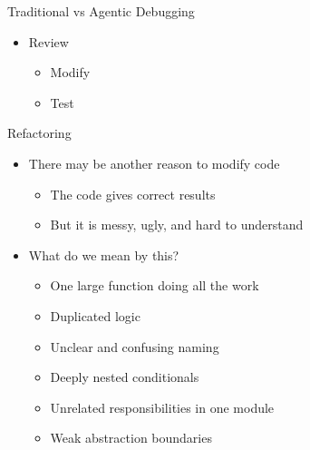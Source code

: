 \documentclass[
ps,
]{prosper}
\begin{document}
\begin{slide}{Traditional vs Agentic Debugging}
\begin{minipage}[t]{5.6cm}
\begin{itemize}
\begin{itemize}
  \item Propose modification
    
  \end{itemize}

\item Review

  \begin{itemize}
    
  \item Modify

  \item Test
    
  \end{itemize}

  

\end{itemize}
\end{minipage}

   
\end{slide}


\begin{slide}{Refactoring}

\begin{itemize}

\item There may be another reason to modify code

  \begin{itemize}
    
  \item The code gives correct results

  \item But it is messy, ugly, and hard to understand
    
  \end{itemize}

\item What do we mean by this?

  \begin{itemize}
    
  \item One large function doing all the work

  \item Duplicated logic

  \item Unclear and confusing naming

  \item Deeply nested conditionals

  \item Unrelated responsibilities in one module

  \item Weak abstraction boundaries
    
  \end{itemize}
  
\end{itemize}
  
\end{slide}
\end{document}
